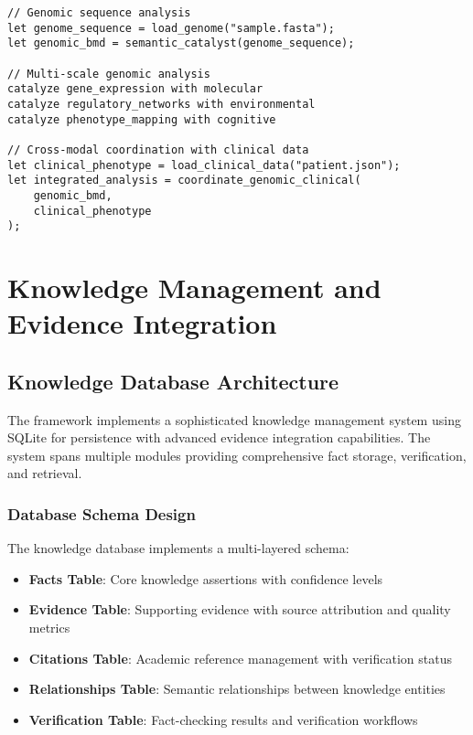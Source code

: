 \documentclass[12pt,a4paper,twoside]{article}
\begin{document}
\begin{itemize}
\begin{lstlisting}[caption=Genomic Information Catalysis]
// Genomic sequence analysis
let genome_sequence = load_genome("sample.fasta");
let genomic_bmd = semantic_catalyst(genome_sequence);

// Multi-scale genomic analysis
catalyze gene_expression with molecular
catalyze regulatory_networks with environmental
catalyze phenotype_mapping with cognitive

// Cross-modal coordination with clinical data
let clinical_phenotype = load_clinical_data("patient.json");
let integrated_analysis = coordinate_genomic_clinical(
    genomic_bmd,
    clinical_phenotype
);
\end{lstlisting}

\section{Knowledge Management and Evidence Integration}

\subsection{Knowledge Database Architecture}

The framework implements a sophisticated knowledge management system using SQLite for persistence with advanced evidence integration capabilities. The system spans multiple modules providing comprehensive fact storage, verification, and retrieval.

\subsubsection{Database Schema Design}

The knowledge database implements a multi-layered schema:

\begin{itemize}
\item \textbf{Facts Table}: Core knowledge assertions with confidence levels
\item \textbf{Evidence Table}: Supporting evidence with source attribution and quality metrics
\item \textbf{Citations Table}: Academic reference management with verification status
\item \textbf{Relationships Table}: Semantic relationships between knowledge entities
\item \textbf{Verification Table}: Fact-checking results and verification workflows
\end{itemize}


\end{itemize}
\end{document}
